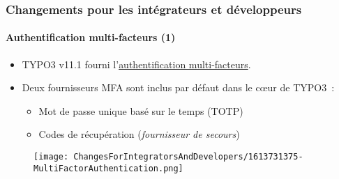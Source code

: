 %

\begin{frame}[fragile]
	\frametitle{Changements pour les intégrateurs et développeurs}
	\framesubtitle{Authentification multi-facteurs (1)}


	\begin{itemize}
		\item TYPO3 v11.1 fourni
			l'\href{https://en.wikipedia.org/wiki/Multi-factor_authentication}{authentification multi-facteurs}.
		\item Deux fournisseurs MFA sont inclus par défaut dans le cœur de TYPO3~:

			\begin{itemize}
				\item Mot de passe unique basé sur le temps (TOTP)
				\item Codes de récupération (\textit{fournisseur de secours})
			\end{itemize}

	\end{itemize}

	\begin{figure}
		\texttt{[image: ChangesForIntegratorsAndDevelopers/1613731375-MultiFactorAuthentication.png]}
	\end{figure}

\end{frame}

